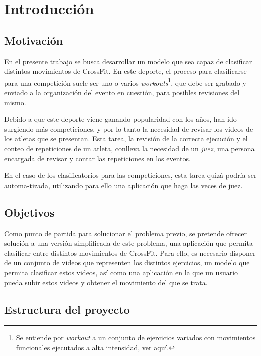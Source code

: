 \chapter{Introducción}


\section{Motivación}

En el presente trabajo se busca desarrollar un modelo que sea capaz de clasificar distintos movimientos de CrossFit. En este deporte, el proceso para clasificarse para una competición suele ser uno o varios \textit{workouts}\footnote{Se entiende por \textit{workout} a un conjunto de ejercicios variados con movimientos funcionales ejecutados a alta intensidad, ver \href{https://www.crossfit.com/what-is-crossfit}{aquí}.}, que debe ser grabado y enviado a la organización del evento en cuestión, para posibles revisiones del mismo.

Debido a que este deporte viene ganando popularidad con los años, han ido surgiendo más competiciones, y por lo tanto la necesidad de revisar los videos de los atletas que se presentan. Esta tarea, la revisión de la correcta ejecución y el conteo de repeticiones de un atleta, conlleva la necesidad de un \textit{juez}, una persona encargada de revisar y contar las repeticiones en los eventos.

En el caso de los clasificatorios para las competiciones, esta tarea quizá podría ser automa-tizada, utilizando para ello una aplicación que haga las veces de juez.

\section{Objetivos}

Como punto de partida para solucionar el problema previo, se pretende ofrecer solución a una versión simplificada de este problema, una aplicación que permita clasificar entre distintos movimientos de CrossFit. Para ello, es necesario disponer de un conjunto de videos que representen los distintos ejercicios, un modelo que permita clasificar estos videos, así como una aplicación en la que un usuario pueda subir estos videos y obtener el movimiento del que se trata.

\section{Estructura del proyecto}

